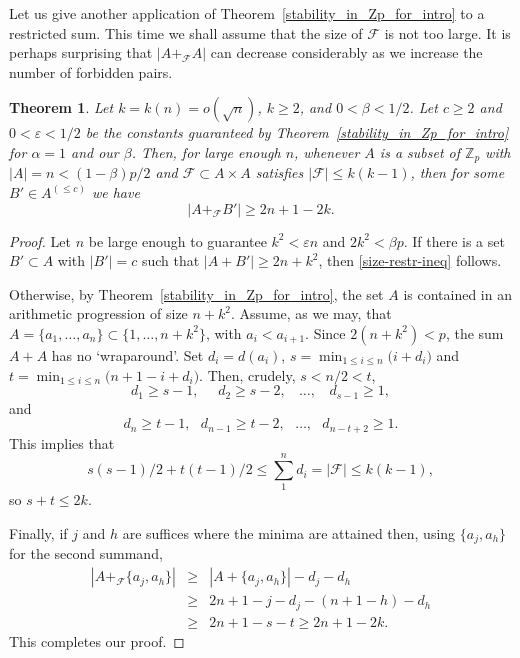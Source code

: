 \documentclass[12pt,reqno]{amsart}
\newtheorem{theorem}{Theorem}
\theoremstyle{definition}
\renewcommand\le{\leqslant}
\renewcommand\ge{\geqslant}
\begin{document}
\vspace{10pt}
Let us give another application of Theorem~\ref{stability_in_Zp_for_intro} to a restricted sum. This time we shall assume that the size of ${\mathcal F}$ is not too large. It is perhaps surprising that $|A+_{\mathcal F} A|$ can decrease considerably as we increase the number of forbidden pairs.
\begin{theorem}\label{restricted-by-small-graphs}
  Let $k=k(n)=o(\sqrt{n})$, $k\ge 2$, and $0<\beta < 1/2$. Let $c\ge 2$ and $0<\varepsilon < 1/2$ be the constants guaranteed by Theorem~\ref{stability_in_Zp_for_intro} for $\alpha=1$ and our $\beta$.
Then, for
 large enough $n$, whenever $A$ is a subset of ${\mathbb Z}_p$ with $|A|=n < (1 - \beta)p/2$ and
${\mathcal F} \subset A \times A$ satisfies $|{\mathcal F}|\le k(k-1)$, then
for some $B'\in A^{(\le c)}$ we have
\begin{equation}\label{size-restr-ineq}
|A+_{\mathcal F} B'|\ge 2n+1-2k.
\end{equation}
\end{theorem}
\begin{proof}
Let $n$ be large enough to guarantee $k^2< \varepsilon n$ and $2k^2<\beta p$.
If there is a set $B'\subset A$ with $|B'|=c$ such that $|A+B'|\ge 2n+k^2$,
then \eqref{size-restr-ineq} follows.

\vspace{5pt}
Otherwise, by Theorem~\ref{stability_in_Zp_for_intro}, the set $A$ is contained in an arithmetic progression of size $n+k^2$. Assume, as we may, that $A=\{a_1, \dots , a_n\}\subset \{1, \dots , n+k^2\}$, with $a_i<a_{i+1}$. Since $2(n+k^2)<p$, the sum $A+A$ has no `wraparound'. Set $d_i=d(a_i)$, $s=\min_{1\le i \le n} \big(i+d_i\big)$ and $t=\min_{1\le i \le n} \big(n+1-i+d_i\big)$. Then, crudely, $s<n/2<t$,
\[
d_1\ge s-1, \ \ \ \ \ \ d_2 \ge s-2, \ \ \ \ \dots , \ \ \ \ d_{s-1}\ge 1,
\]
and
\[
d_n\ge t-1, \ \ \ d_{n-1} \ge t-2, \ \ \ \dots , \ \ \ d_{n-t+2}\ge 1.
\]
This implies that
\[
s(s-1)/2+t(t-1)/2 \le \sum_1^n d_i= |{\mathcal F}| \le k(k-1),
\]
so $s+t\le 2k$.

\vspace{5pt}
Finally, if $j$ and $h$ are suffices where the minima are attained then, using $\{a_j, a_h\}$ for the second summand,
\begin{eqnarray*}
|A+_{\mathcal F} \{a_j, a_h\}|&\ge& |A+ \{a_j, a_h\}|-d_j-d_h\\
     &\ge&2n+1-j-d_j-(n+1-h)-d_h\\
     &\ge&2n+1-s-t\ge 2n+1-2k.
\end{eqnarray*}
This completes our proof.
\end{proof}
\end{document}
